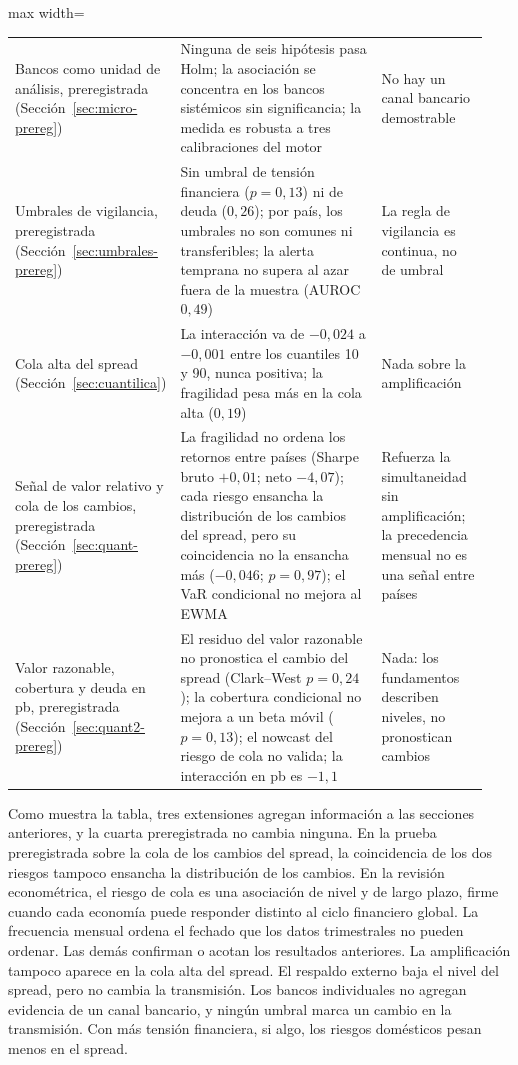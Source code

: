 \begin{table}[htbp]
\begin{adjustbox}{max width=\linewidth}
\begin{tabular}{>{\raggedright\arraybackslash}p{0.24\linewidth}>{\raggedright\arraybackslash}p{0.47\linewidth}>{\raggedright\arraybackslash}p{0.23\linewidth}}
\addlinespace
Bancos como unidad de análisis, preregistrada (Sección~\ref{sec:micro-prereg}) & Ninguna de seis hipótesis pasa Holm; la asociación se concentra en los bancos sistémicos sin significancia; la medida es robusta a tres calibraciones del motor & No hay un canal bancario demostrable \\
\addlinespace
Umbrales de vigilancia, preregistrada (Sección~\ref{sec:umbrales-prereg}) & Sin umbral de tensión financiera ($p=0{,}13$) ni de deuda ($0{,}26$); por país, los umbrales no son comunes ni transferibles; la alerta temprana no supera al azar fuera de la muestra (AUROC $0{,}49$) & La regla de vigilancia es continua, no de umbral \\
\addlinespace
Cola alta del spread (Sección~\ref{sec:cuantilica}) & La interacción va de $-0{,}024$ a $-0{,}001$ entre los cuantiles 10 y 90, nunca positiva; la fragilidad pesa más en la cola alta ($0{,}19$) & Nada sobre la amplificación \\
\addlinespace
Señal de valor relativo y cola de los cambios, preregistrada (Sección~\ref{sec:quant-prereg}) & La fragilidad no ordena los retornos entre países (Sharpe bruto $+0{,}01$; neto $-4{,}07$); cada riesgo ensancha la distribución de los cambios del spread, pero su coincidencia no la ensancha más ($-0{,}046$; $p=0{,}97$); el VaR condicional no mejora al EWMA & Refuerza la simultaneidad sin amplificación; la precedencia mensual no es una señal entre países \\
\addlinespace
Valor razonable, cobertura y deuda en pb, preregistrada (Sección~\ref{sec:quant2-prereg}) & El residuo del valor razonable no pronostica el cambio del spread (Clark--West $p=0{,}24$); la cobertura condicional no mejora a un beta móvil ($p=0{,}13$); el nowcast del riesgo de cola no valida; la interacción en pb es $-1{,}1$ & Nada: los fundamentos describen niveles, no pronostican cambios \\
\bottomrule
\end{tabular}
\end{adjustbox}
\end{table}

Como muestra la tabla, tres extensiones agregan información a las secciones anteriores, y la cuarta preregistrada no cambia ninguna. En la prueba preregistrada sobre la cola de los cambios del spread, la coincidencia de los dos riesgos tampoco ensancha la distribución de los cambios. En la revisión econométrica, el riesgo de cola es una asociación de nivel y de largo plazo, firme cuando cada economía puede responder distinto al ciclo financiero global. La frecuencia mensual ordena el fechado que los datos trimestrales no pueden ordenar. Las demás confirman o acotan los resultados anteriores. La amplificación tampoco aparece en la cola alta del spread. El respaldo externo baja el nivel del spread, pero no cambia la transmisión. Los bancos individuales no agregan evidencia de un canal bancario, y ningún umbral marca un cambio en la transmisión. Con más tensión financiera, si algo, los riesgos domésticos pesan menos en el spread.

